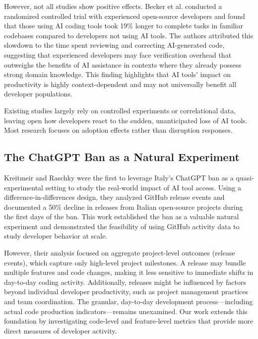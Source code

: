 However, not all studies show positive effects. Becker et al. \cite[p.~2]{becker2025measuringimpactearly2025ai} conducted a randomized controlled trial with experienced open-source developers and found that those using AI coding tools took 19\% longer to complete tasks in familiar codebases compared to developers not using AI tools. The authors attributed this slowdown to the time spent reviewing and correcting AI-generated code, suggesting that experienced developers may face verification overhead that outweighs the benefits of AI assistance in contexts where they already possess strong domain knowledge. This finding highlights that AI tools' impact on productivity is highly context-dependent and may not universally benefit all developer populations.

Existing studies largely rely on controlled experiments or correlational data, leaving open how developers react to the sudden, unanticipated loss of AI tools. Most research focuses on adoption effects rather than disruption responses.

\subsection{The ChatGPT Ban as a Natural Experiment}

Kreitmeir and Raschky \cite[p.~7]{Kreitmeir2023} were the first to leverage Italy's ChatGPT ban as a quasi-experimental setting to study the real-world impact of AI tool access. Using a difference-in-differences design, they analyzed GitHub release events and documented a 50\% decline in releases from Italian open-source projects during the first days of the ban. This work established the ban as a valuable natural experiment and demonstrated the feasibility of using GitHub activity data to study developer behavior at scale.

However, their analysis focused on aggregate project-level outcomes (release events), which capture only high-level project milestones. A release may bundle multiple features and code changes, making it less sensitive to immediate shifts in day-to-day coding activity. Additionally, releases might be influenced by factors beyond individual developer productivity, such as project management practices and team coordination. The granular, day-to-day development process---including actual code production indicators---remains unexamined. Our work extends this foundation by investigating code-level and feature-level metrics that provide more direct measures of developer activity.

